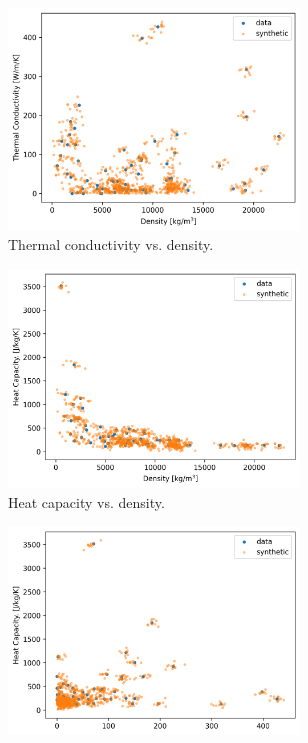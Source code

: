 \begin{figure}[htbp!] %
  \centering
  \begin{subfigure}[b]{0.49\textwidth}
    \centering
    \includegraphics[width=0.85\textwidth]{figures/syn-rho_k}
    \caption{Thermal conductivity vs. density.}
  \end{subfigure}
  \hfill
  \begin{subfigure}[b]{0.49\textwidth}
    \centering
    \includegraphics[width=0.85\textwidth]{figures/syn-rho_cp}
    \caption{Heat capacity vs. density.}
  \end{subfigure}
  \par
  \begin{subfigure}[b]{0.49\textwidth}
    \centering
    \includegraphics[width=0.85\textwidth]{figures/syn-k_cp}

\end{subfigure}
\end{figure}
